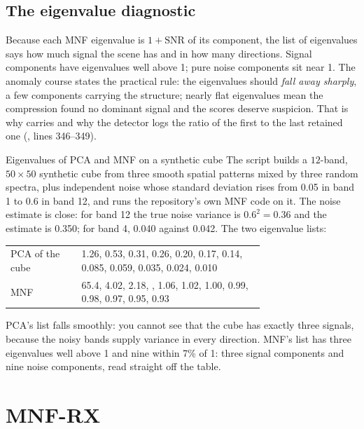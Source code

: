 \subsection{The eigenvalue diagnostic}

Because each MNF eigenvalue is $1 + \text{SNR}$ of its component, the list of eigenvalues says how much
signal the scene has and in how many directions. Signal components have eigenvalues well above 1; pure
noise components sit near 1. The anomaly course states the practical rule: the eigenvalues should
\emph{fall away sharply}, a few components carrying the structure; nearly flat eigenvalues mean the
compression found no dominant signal and the scores deserve suspicion. That is why
 carries  and why the detector logs the ratio of
the first to the last retained one (, lines 346--349).

\begin{worked}[label={we:localrx:spectrum}]{Eigenvalues of PCA and MNF on a synthetic cube}
The script builds a $12$-band, $50\times50$ synthetic cube from three smooth spatial patterns mixed by
three random spectra, plus independent noise whose standard deviation rises from 0.05 in band 1 to 0.6
in band 12, and runs the repository's own MNF code on it\tagC. The noise estimate is close: for band 12
the true noise variance is $0.6^2 = 0.36$ and the estimate is 0.350; for band 4, 0.040 against
0.042. The two eigenvalue lists:
\begin{center}
\begin{tabular}{lp{0.72\linewidth}}
\toprule
PCA of the cube & 1.26, 0.53, 0.31, 0.26, 0.20, 0.17, 0.14, 0.085, 0.059, 0.035, 0.024, 0.010\\
MNF & 65.4, 4.02, 2.18, \quad 1.07, 1.06, 1.02, 1.00, 0.99, 0.98, 0.97, 0.95, 0.93\\
\bottomrule
\end{tabular}
\end{center}
PCA's list falls smoothly: you cannot see that the cube has exactly three signals, because the noisy
bands supply variance in every direction. MNF's list has three eigenvalues well above 1 and nine
within 7\% of 1: three signal components and nine noise components, read straight off the table.
\end{worked}

\section{MNF-RX}\label{sec:localrx:mnfrx}


